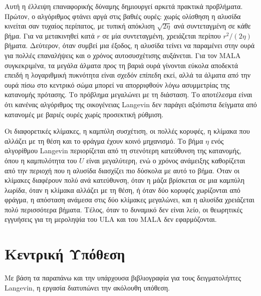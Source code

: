 Αυτή η έλλειψη επαναφορικής δύναμης δημιουργεί αρκετά πρακτικά προβλήματα.
Πρώτον, ο αλγόριθμος φτάνει αργά στις βαθιές ουρές: χωρίς ολίσθηση η αλυσίδα
κινείται σαν τυχαίος περίπατος, με τυπική απόκλιση $\sqrt{2\eta}$ ανά συντεταγμένη σε
κάθε βήμα. Για να μετακινηθεί κατά $r$ σε μία συντεταγμένη, χρειάζεται περίπου
$r^2/(2\eta)$ βήματα. Δεύτερον, όταν συμβεί μια έξοδος, η αλυσίδα τείνει να παραμένει στην ουρά
για πολλές επαναλήψεις και ο χρόνος αυτοσυσχέτισης αυξάνεται. Για τον MALA
συγκεκριμένα, τα μεγάλα άλματα \emph{προς} τη βαριά ουρά γίνονται εύκολα
αποδεκτά επειδή η λογαριθμική πυκνότητα είναι σχεδόν επίπεδη εκεί, αλλά τα
άλματα \emph{από} την ουρά πίσω στο κεντρικό σώμα μπορεί να απορριφθούν λόγω
ασυμμετρίας της κατανομής πρότασης. Το πρόβλημα μεγαλώνει με τη
διάσταση. Το αποτέλεσμα είναι ότι κανένας αλγόριθμος της οικογένειας Langevin
δεν παράγει αξιόπιστα δείγματα από κατανομές με βαριές ουρές χωρίς προσεκτική ρύθμιση.

Οι διαφορετικές κλίμακες, η καμπύλη συσχέτιση, οι πολλές κορυφές, η κλίμακα που
αλλάζει με τη θέση και το φράγμα έχουν κοινό μηχανισμό. Το βήμα $\eta$ ενός
αλγορίθμου Langevin περιορίζεται από τη στενότερη κατεύθυνση της κατανομής, όπου η
καμπυλότητα του $U$ είναι μεγαλύτερη, ενώ ο χρόνος ανάμειξης καθορίζεται από την
περιοχή που η αλυσίδα διασχίζει πιο δύσκολα με αυτό το βήμα. Όταν οι κλίμακες
διαφέρουν πολύ ανά κατεύθυνση, όταν η μάζα βρίσκεται σε μια καμπύλη λωρίδα, όταν η
κλίμακα αλλάζει με τη θέση, ή όταν δύο κορυφές χωρίζονται από φράγμα, η απόσταση
ανάμεσα στις δύο κλίμακες μεγαλώνει, και η αλυσίδα χρειάζεται πολύ περισσότερα
βήματα. Τέλος, όταν το δυναμικό δεν είναι λείο, οι θεωρητικές εγγυήσεις για τη
μεροληψία του ULA και του MALA \citep{dalalyan2017theoretical, durmus2017nonasymptotic}
δεν εφαρμόζονται.

\section{Κεντρική Υπόθεση}
\label{sec:intro-hypothesis}

Με βάση τα παραπάνω και την υπάρχουσα βιβλιογραφία για τους δειγματολήπτες
Langevin, η εργασία διατυπώνει την ακόλουθη υπόθεση.


